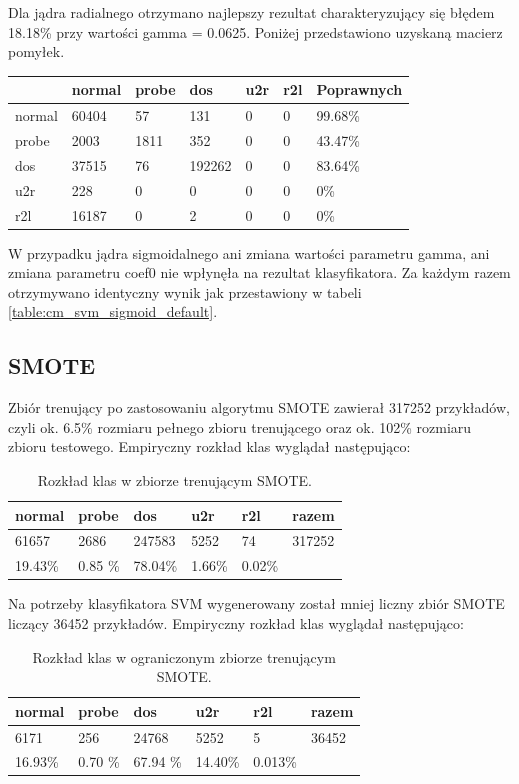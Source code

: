 \documentclass[a4paper, 12pt]{article}
\begin{document}
Dla jądra radialnego otrzymano najlepszy rezultat charakteryzujący się błędem 18.18\% przy wartości gamma = 0.0625. Poniżej przedstawiono uzyskaną macierz pomyłek.

\begin{table}[H]
\centering
\begin{tabular}{ | l | l | l | l | l | l | l | } \hline
	& normal & probe & dos 	& u2r 	& r2l 	& Poprawnych	\\ \hline
normal &  60404 &   57 &  131  & 0  &  0 & 99.68\% \\ \hline
probe  &  2003 & 1811  &  352  &  0 & 0 & 43.47\% \\ \hline
dos    &  37515  &  76 & 192262 &  0  & 0 & 83.64\% \\ \hline
u2r    &    228   &  0   &   0 &  0 & 0 & 0\% \\ \hline
r2l    &  16187   &  0   &   2 &  0 &  0 & 0\% \\ \hline
\end{tabular} 
\end{table}

W przypadku jądra sigmoidalnego ani zmiana wartości parametru gamma, ani zmiana parametru coef0 nie wpłynęła na rezultat klasyfikatora. Za każdym razem otrzymywano identyczny wynik jak przestawiony w tabeli \ref{table:cm_svm_sigmoid_default}.

\subsection{SMOTE}
\label{smote}

Zbiór trenujący po zastosowaniu algorytmu SMOTE zawierał 317252 przykładów, 
czyli ok. 6.5\% rozmiaru pełnego zbioru trenującego oraz ok. 102\% rozmiaru
zbioru testowego. Empiryczny rozkład klas wyglądał następująco:

\begin{table}[H]
\centering
	\begin{tabular}{ | l | l | l | l | l | l | } \hline
		normal & probe & dos & u2r & r2l & razem \\ \hline
		61657 & 2686 & 247583 & 5252 & 74 & 317252 \\ \hline
		19.43\% & 0.85 \% & 78.04\% & 1.66\%  & 0.02\% & \\ \hline
	\end{tabular}
\caption{Rozkład klas w zbiorze trenującym SMOTE.}
\label{table:test}
\end{table}

Na potrzeby klasyfikatora SVM wygenerowany został mniej liczny zbiór SMOTE liczący 36452 przykładów. Empiryczny rozkład klas wyglądał następująco:
\begin{table}[H]
\centering
	\begin{tabular}{ | l | l | l | l | l | l | } \hline
		normal & probe & dos & u2r & r2l & razem \\ \hline
		6171 & 256 & 24768 & 5252 & 5 & 36452 \\ \hline
		16.93\% & 0.70 \% & 67.94 \% & 14.40\%  & 0.013\% & \\ \hline
	\end{tabular}
\caption{Rozkład klas w ograniczonym zbiorze trenującym SMOTE.}
\label{table:test}
\end{table}
\end{document}
